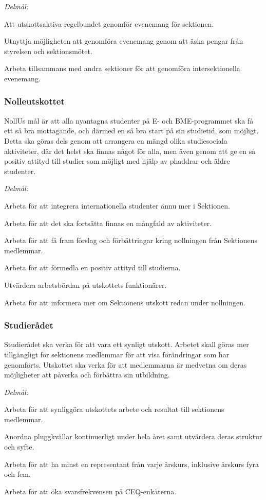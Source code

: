 \documentclass[../_main/handlingar.tex]{subfiles}
\begin{document}
\emph{Delmål:}
\begin{dashlist}
    \item Att utskottsaktiva regelbundet genomför evenemang för sektionen.
    \item Utnyttja möjligheten att genomföra evenemang genom att äska pengar från styrelsen och sektionsmötet.
    \item Arbeta tillsammans med andra sektioner för att genomföra intersektionella evenemang.
\end{dashlist}

\newpage

\subsubsection*{Nolleutskottet}
NollUs mål är att alla nyantagna studenter på E- och BME-programmet ska få ett så bra mottagande, och därmed en så bra start på sin studietid, som möjligt. Detta ska göras dels genom att arrangera en mängd olika studiesociala aktiviteter, där det helst ska finnas något för alla, men även genom att ge en så positiv attityd till studier som möjligt med hjälp av phaddrar och äldre studenter.

\emph{Delmål:}
\begin{dashlist}
    \item Arbeta för att integrera internationella studenter ännu mer i Sektionen.
    \item Arbeta för att det ska fortsätta finnas en mångfald av aktiviteter.
    \item Arbeta för att få fram förslag och förbättringar kring nollningen från Sektionens medlemmar.
    \item Arbeta för att förmedla en positiv attityd till studierna.
    \item Utvärdera arbetsbördan på utskottets funktionärer.
    \item Arbeta för att informera mer om Sektionens utskott redan under nollningen.
\end{dashlist}

\subsubsection*{Studierådet}
Studierådet ska verka för att vara ett synligt utskott. Arbetet skall göras mer tillgängligt för sektionens medlemmar för att visa förändringar som har genomförts. Utskottet ska verka för att medlemmarna är medvetna om deras möjligheter att påverka och förbättra sin utbildning.

\emph{Delmål:}
\begin{dashlist}
    \item Arbeta för att synliggöra utskottets arbete och resultat till sektionens medlemmar.
    \item Anordna pluggkvällar kontinuerligt under hela året samt utvärdera deras struktur och syfte.
    \item Arbeta för att ha minst en representant från varje årskurs, inklusive årskurs fyra och fem.
    \item Arbeta för att öka svarsfrekvensen på CEQ-enkäterna.
\end{dashlist}

\newpage
\end{document}
